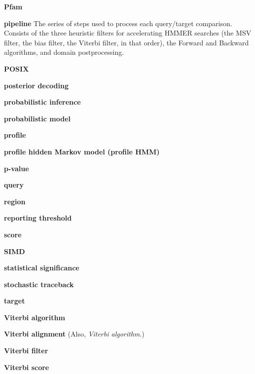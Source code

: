 \begin{wideitem}
\item[\textbf{Pfam}]

\item[\textbf{pipeline}] The series of steps used to process each
query/target comparison. Consists of the three heuristic filters for
accelerating HMMER searches (the MSV filter, the bias filter, the
Viterbi filter, in that order), the Forward and Backward algorithms,
and domain postprocessing.

\item[\textbf{POSIX}]

\item[\textbf{posterior decoding}]

\item[\textbf{probabilistic inference}]

\item[\textbf{probabilistic model}]

\item[\textbf{profile}]

\item[\textbf{profile hidden Markov model (profile HMM)}]

\item[\textbf{p-value}]

\item[\textbf{query}] 

\item[\textbf{region}]

\item[\textbf{reporting threshold}]

\item[\textbf{score}]

\item[\textbf{SIMD}]

\item[\textbf{statistical significance}]

\item[\textbf{stochastic traceback}]

\item[\textbf{target}]

\item[\textbf{Viterbi algorithm}]

\item[\textbf{Viterbi alignment}] (Also, \emph{Viterbi algorithm}.)

\item[\textbf{Viterbi filter}]

\item[\textbf{Viterbi score}]




\end{wideitem}

